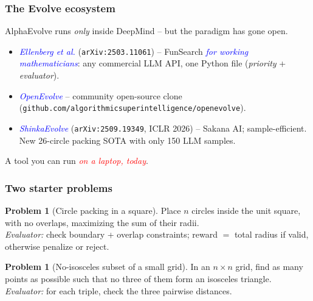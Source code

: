 \documentclass{beamer}
\theoremstyle{definition}
\newtheorem{prob}[thm]{Problem}
\newcommand\remph[1]{\emph{\textcolor{red}{#1}}}
\newcommand\bemph[1]{\emph{\textcolor{blue}{#1}}}
\begin{document}

\begin{frame} 
  \frametitle{The Evolve ecosystem}
  AlphaEvolve runs \emph{only} inside DeepMind --
  but the paradigm has gone open.
  \pause
  \vspace{.2cm}

  \begin{itemize}
    \setlength{\itemsep}{.15cm}
    \item[$\bullet$] \bemph{Ellenberg et al.} (\texttt{arXiv:2503.11061}) --
      FunSearch \bemph{for working mathematicians}: any commercial LLM API,
      one Python file (\emph{priority} + \emph{evaluator}).
    \item[$\bullet$] \bemph{OpenEvolve} -- community open-source clone
      (\texttt{github.com/algorithmicsuperintelligence/openevolve}).
    \pause
    \item[$\bullet$] \bemph{ShinkaEvolve} (\texttt{arXiv:2509.19349}, ICLR 2026) --
      Sakana AI; sample-efficient. New 26-circle packing SOTA with only
      150 LLM samples.
  \end{itemize}
  \pause
  \vspace{.2cm}

  \begin{center}
    A tool you can run \remph{on a laptop, today}.
  \end{center}
\end{frame}


\begin{frame}
  \frametitle{Two starter problems}
  \begin{prob}[Circle packing in a square]
    Place \( n \) circles inside the unit square, with no overlaps,
    maximizing the sum of their radii.
    \\ \pause
    \emph{Evaluator:} check boundary + overlap constraints; reward \(=\)
    total radius if valid, otherwise penalize or reject.
  \end{prob}
  \pause
  \vspace{.3cm}

  \begin{prob}[No-isosceles subset of a small grid]
    In an \( n \times n \) grid, find as many points as possible such
    that no three of them form an isosceles triangle.
    \\ \pause
    \emph{Evaluator:} for each triple, check the three pairwise distances.
  \end{prob}
\end{frame}
\end{document}
